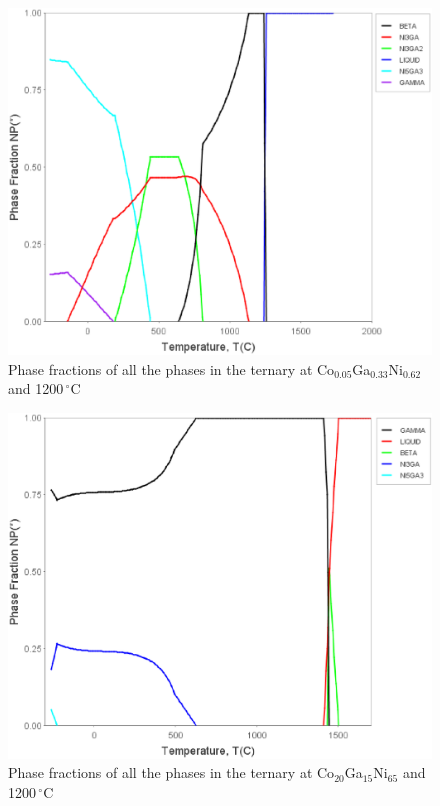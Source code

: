 \documentclass[article]{elsarticle}
\begin{document}
\begin{figure}
\centering
\includegraphics[scale=0.4]{Co_5}
\caption{Phase fractions of all the phases in the ternary at Co$_{0.05}$Ga$_{0.33}$Ni$_{0.62}$ and 1200$\,^{\circ}\mathrm{C}$}
\label{NP_Co5}
\end{figure}
\begin{figure}
\centering
\includegraphics[scale=0.4]{np_ternary_Co20}
\caption{Phase fractions of all the phases in the ternary at Co$_{20}$Ga$_{15}$Ni$_{65}$ and 1200$\,^{\circ}\mathrm{C}$}
\label{NP_Co20}
\end{figure}
\end{document}
